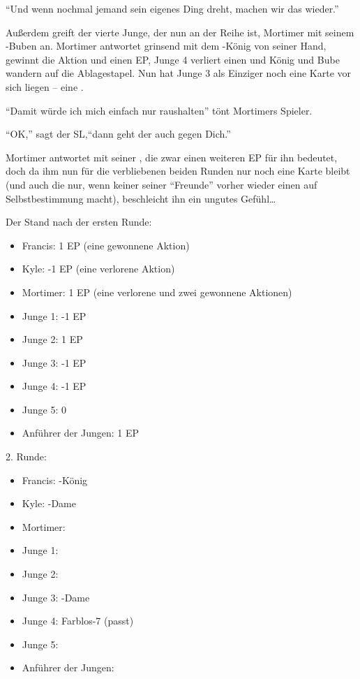 "`Und wenn nochmal jemand sein eigenes Ding dreht, machen wir das wieder."'

Außerdem greift der vierte Junge, der nun an der Reihe ist, Mortimer mit seinem \pik-Buben an.
Mortimer antwortet grinsend mit dem \herz-König von seiner Hand, gewinnt die Aktion und einen EP, Junge 4 verliert einen und König und Bube wandern auf die Ablagestapel.
Nun hat Junge 3 als Einziger noch eine Karte vor sich liegen -- eine .

"`Damit würde ich mich einfach nur raushalten"' tönt Mortimers Spieler.

"`OK,"' sagt der SL,"`dann geht der auch gegen Dich."'

Mortimer antwortet mit seiner , die zwar einen weiteren EP für ihn bedeutet, doch da ihm nun für die verbliebenen beiden Runden nur noch eine Karte bleibt (und auch die nur, wenn keiner seiner "`Freunde"' vorher wieder einen auf Selbstbestimmung macht), beschleicht ihn ein ungutes Gefühl\dots

Der Stand nach der ersten Runde:
\begin {itemize}
\item Francis: 1 EP (eine gewonnene Aktion)
\item Kyle: -1 EP (eine verlorene Aktion)
\item Mortimer: 1 EP (eine verlorene und zwei gewonnene Aktionen)
\item Junge 1: -1 EP
\item Junge 2: 1 EP
\item Junge 3: -1 EP
\item Junge 4: -1 EP
\item Junge 5: 0
\item Anführer der Jungen: 1 EP
\end {itemize}

2. Runde:
\begin {itemize}
\item Francis: \pik-König
\item Kyle: \kreuz-Dame
\item Mortimer: 
\item Junge 1: 
\item Junge 2: 
\item Junge 3: \herz-Dame
\item Junge 4: Farblos-7 (passt)
\item Junge 5: 
\item Anführer der Jungen: 
\end {itemize}

